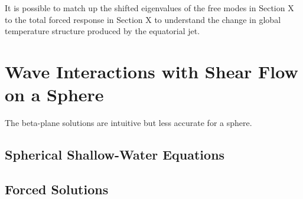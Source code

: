It is possible to match up the shifted eigenvalues of the free modes in Section X to the total forced response in Section X to understand the change in global temperature structure produced by the equatorial jet.





\section{Wave Interactions with Shear Flow on a Sphere}

The beta-plane solutions are intuitive but less accurate for a sphere.



\subsection{Spherical Shallow-Water Equations}

\subsection{Forced Solutions}

